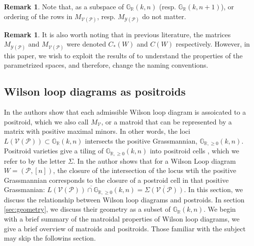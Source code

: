 \documentclass[11pt]{article}
\newcommand{\R}{\mathbb{R}}
\newcommand{\Gr}{\mathbb{G}_{\R, \geq 0}}
\newcommand{\Grall}{\mathbb{G}_{\R}}
\newcommand{\cP}{\mathcal{P}}
\newcommand{\cV}{\mathcal{V}}
\newcommand{\cY}{\mathcal{Y}}
\newcommand{\VP}{\cV(\cP)}
\newcommand{\YP}{\cY(\cP)}
\theoremstyle{remark}
\theoremstyle{definition}
\newtheorem{rmk}[thm]{Remark}
\begin{document}
 
\begin{rmk}
Note that, as a subspace of $\Grall(k, n)$ (resp. $\Grall(k, n+1)$), or ordering of the rows in $M_{\VP}$, resp. $M_{\YP}$ do not matter.
\end{rmk}

\begin{rmk}
It is also worth noting that in previous literature, the matrices $M_{\YP}$ and $M_{\VP}$ were denoted $C_*(W)$ and $C(W)$ respectively. However, in this paper, we wish to exploit the results of \cite{basisshapeloci} to understand the properties of the parametrized spaces, and therefore, change the naming conventions. 
\end{rmk}

\subsection{Wilson loop diagrams as positroids \label{sec:WLDmatroid}}

In \cite{wilsonloop} the authors show that each admissible Wilson loop diagram is assoicated to a positroid, which we also call $M_\cV$, or a matroid that can be represented by a matrix with positive maximal minors. In other words, the loci $L(\VP) \subset \Grall(k,n)$ intersects the positive Grassmannian, $\Gr(k,n)$. Positroid varieties give a tiling of $\Gr(k,n)$ into positroid cells \cite{??}, which we refer to by the letter $\Sigma$. In \cite[Theorem 8.4]{basisshapeloci} the author shows that for a Wilson Loop diagram $W = (\cP, [n])$, the closure of the intersection of the locus wtih the positive Grassmannian corresponds to the closure of a postroid cell in that positive Grassmanian: $\overline{L(\VP) \cap \Gr(k,n)} = \overline{\Sigma(\VP)}$. In this section, we discuss the relationship between Wilson loop diagrams and postroids. In section \ref{sec:geometry}, we discuss their geometry as a subset of $\Grall(k, n)$. We begin with a brief summary of the matroidal properties of Wilson loop diagrams, we give a brief overview of matroids and positroids. Those familiar with the subject may skip the followins section.
\end{document}
